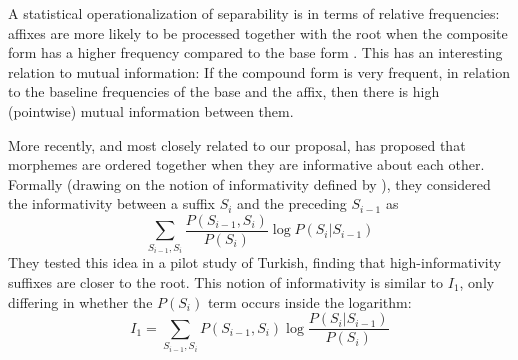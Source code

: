\documentclass[11pt,letterpaper]{article}
\newcommand{\citep}{\parencite}
\newcommand{\citet}{\Textcite}
\newcounter{def}
\begin{document}
A statistical operationalization of separability is in terms of relative frequencies:
affixes are more likely to be processed together with the root when the composite form has a higher frequency compared to the base form \cite{hay2001lexical, lee2011ordering}.
This has an interesting relation to mutual information: 
If the compound form is very frequent, in relation to the baseline frequencies of the base and the affix, then there is high (pointwise) mutual information between them.

More recently, and most closely related to our proposal, \citet{inkelas2015informativity} has proposed that morphemes are ordered together when they are informative about each other.
Formally (drawing on the notion of informativity defined by \citet{priva2017informativity}), they considered the informativity between a suffix $S_i$ and the preceding $S_{i-1}$ as 
\begin{equation}
    \sum_{S_{i-1}, S_{i}} \frac{P(S_{i-1} , S_i)}{P(S_i)} \log P(S_i | S_{i-1})
\end{equation}
They tested this idea in a pilot study of Turkish, finding that high-informativity suffixes are closer to the root.
This notion of informativity is similar to $I_1$, only differing in whether the $P(S_i)$ term occurs inside the logarithm:
\begin{equation}
   I_1 = \sum_{S_{i-1}, S_{i}} P(S_{i-1} , S_i) \log \frac{P(S_i | S_{i-1})}{P(S_i)}
\end{equation}


\end{document}
